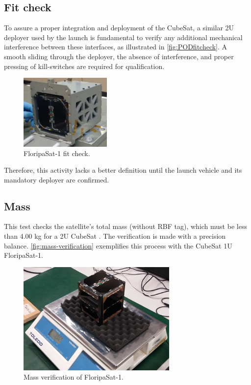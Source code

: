 \subsection{Fit check}

To assure a proper integration and deployment of the CubeSat, a similar 2U deployer used by the launch is fundamental to verify any additional mechanical interference between these interfaces, as illustrated in \autoref{fig:PODfitcheck}. A smooth sliding through the deployer, the absence of interference, and proper pressing of kill-switches are required for qualification.



\begin{figure}[!htb]
    \begin{center}
        \includegraphics[width=0.4\textwidth]{figures/fit-test.png}
        \caption{FloripaSat-1 fit check.}
        \label{fig:PODfitcheck}
    \end{center}
\end{figure}


Therefore, this activity lacks a better definition until the launch vehicle and its mandatory deployer are confirmed.

\subsection{Mass}

This test checks the satellite's total mass (without RBF tag), which must be less than 4.00 kg for a 2U CubeSat \cite{cds}. The verification is made with a precision balance. \autoref{fig:mass-verification} exemplifies this process with the CubeSat 1U FloripaSat-1.

\begin{figure}[H]
    \begin{center}
        \includegraphics[width=0.7\textwidth]{figures/mass-test.png}
        \caption{Mass verification of FloripaSat-1.}
        \label{fig:mass-verification}
    \end{center}
\end{figure}


